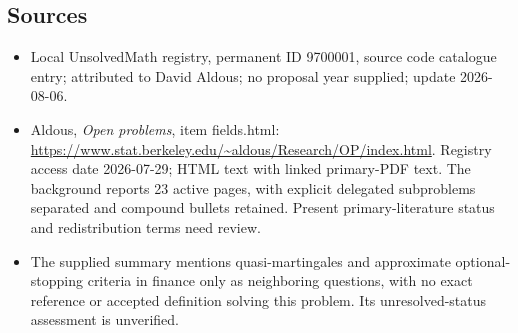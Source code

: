 \documentclass[11pt]{article}
\begin{document}
\subsection{Sources}
\begin{itemize}
\item Local UnsolvedMath registry, permanent ID 9700001, source code catalogue entry; attributed to David Aldous; no proposal year supplied; update 2026-08-06.
\item Aldous, \emph{Open problems}, item fields.html: \url{https://www.stat.berkeley.edu/~aldous/Research/OP/index.html}. Registry access date 2026-07-29; HTML text with linked primary-PDF text. The background reports 23 active pages, with explicit delegated subproblems separated and compound bullets retained. Present primary-literature status and redistribution terms need review.
\item The supplied summary mentions quasi-martingales and approximate optional-stopping criteria in finance only as neighboring questions, with no exact reference or accepted definition solving this problem. Its unresolved-status assessment is unverified.
\end{itemize}
\end{document}
